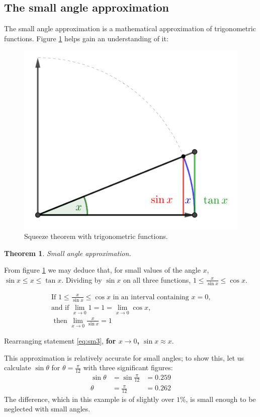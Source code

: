 \documentclass[12pt, a4paper, titlepage]{article}
\theoremstyle{definition}
\numberwithin{equation}{section}
\theoremstyle{definition}
\theoremstyle{definition}
\newtheorem*{theorem*}{Theorem}
\begin{document}
\subsection{The small angle approximation}\label{sub:small}
The small angle approximation is a mathematical approximation of trigonometric functions. Figure \ref{fig:squeeze} helps gain an understanding of it:
\begin{figure}[H]
    \centering
    \includegraphics[scale=5]{squeeze-theorem.png}
    \caption{Squeeze theorem with trigonometric functions.}
    \label{fig:squeeze}
\end{figure}
\begin{theorem*}
\textit{Small angle approximation.}
\begin{adjustwidth}{2cm}{}
From figure \ref{fig:squeeze} we may deduce that, for small values of the angle $x$, $\sin{x}\leq x \leq \tan{x}$. Dividing  by $\sin{x}$ on all three functions, $1\leq \frac{x}{\sin{x}} \leq \cos{x}$.
\end{adjustwidth}
\begin{gather}
\text{If }1\leq \frac{x}{\sin{x}}\leq \cos{x}\text{ in an interval containing }x=0\text{,}\\
\text{and if }\lim_{x\to 0}{1}=1=\lim_{x\to 0}{\cos{x}},\\
\text{ then }\lim_{x\to 0}{\frac{x}{\sin{x}}}=1\label{eq:sm3}
\end{gather}
\begin{adjustwidth}{2cm}{}
Rearranging statement \eqref{eq:sm3}, \textbf{for \boldmath$x\to 0$, $\sin{x}\approx x$}.
\end{adjustwidth}
\end{theorem*}
\noindent This approximation is relatively accurate for small angles; to show this, let us calculate $\sin{\theta}$ for $\theta = \frac{\pi}{12}$ with three significant figures:
\begin{alignat*}{2}
\sin{\theta} &= \sin{\frac{\pi}{12}} &= 0.259 \\
\theta &= \frac{\pi}{12} &= 0.262
\end{alignat*}
The difference, which in this example is of slightly over $1\%$, is small enough to be neglected with small angles.
\end{document}
